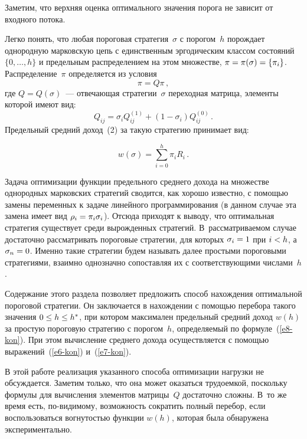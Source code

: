 \begin{multicols}{2}
  Заметим, что верхняя оценка оптимального значения порога не зависит от входного 
потока.


  
  Легко понять, что любая пороговая стратегия~$\sigma$ с порогом~$h$ порождает 
однородную марковскую цепь с единственным эргодическим классом состояний 
$\{0,\ldots , h\}$ и предельным распределением на этом множестве, $\pi\hm= 
\pi(\sigma)\hm=\{\pi_i\}$. Распределение~$\pi$ определяется из условия
  \begin{equation}
  \pi=Q\pi\,,
  \label{e7-kon}
  \end{equation}
где $Q=Q(\sigma)$~--- отвечающая стратегии~$\sigma$ переходная матрица, элементы 
которой имеют вид:
$$
Q_{ij} =\sigma_i Q_{ij}^{(1)}+(1-\sigma_i) Q_{ij}^{(0)}\,.
$$
  Предельный средний доход~(2) за такую стратегию принимает вид:
  
  \noindent
  \begin{equation}
  w(\sigma)=\sum\limits_{i=0}^h \pi_i R_i\,.
  \label{e8-kon}
  \end{equation}
  

 
  Задача оптимизации функции предельного среднего дохода на множестве однородных 
марковских стратегий сводится, как хорошо известно, с помощью замены переменных к 
задаче линейного программирования (в данном случае эта замена имеет вид $\rho_i\hm= 
\pi_i\sigma_i$). Отсюда приходят к выводу, что оптимальная стратегия существует среди 
вы\-рож\-ден\-ных стратегий. В~рассматриваемом случае достаточно рассматривать 
пороговые стратегии, для которых $\sigma_i\hm=1$ при $i\hm<h$, а $\sigma_n\hm=0$. 
Именно такие стратегии будем называть далее простыми пороговыми стратегиями, 
взаимно однозначно сопоставляя их с соответствующими числами~$h$.
  
  Содержание этого раздела позволяет предложить способ нахождения оптимальной 
пороговой стратегии. Он заключается в нахождении с по\-мощью перебора такого значения 
$0\hm\leq h\hm\leq h^*$, при котором максимален предельный средний доход $w(h)$ за 
простую пороговую стратегию с порогом~$h$, определяемый по формуле~(\ref{e8-kon}). 
При этом вы\-чис\-ле\-ние среднего дохода осуществляется с помощью 
  выражений~(\ref{e6-kon}) и~(\ref{e7-kon}).
  
  В этой работе реализация указанного способа оптимизации нагрузки не обсуждается. 
Заметим только, что она может оказаться трудоемкой, поскольку формулы для 
вычисления элементов мат\-ри\-цы~$Q$ достаточно сложны. В~то же время есть, 
по-ви\-ди\-мо\-му, возможность сократить полный перебор, если воспользоваться вогнутостью 
функции $w(h)$, которая была обнаружена экспериментально.


\end{multicols}
